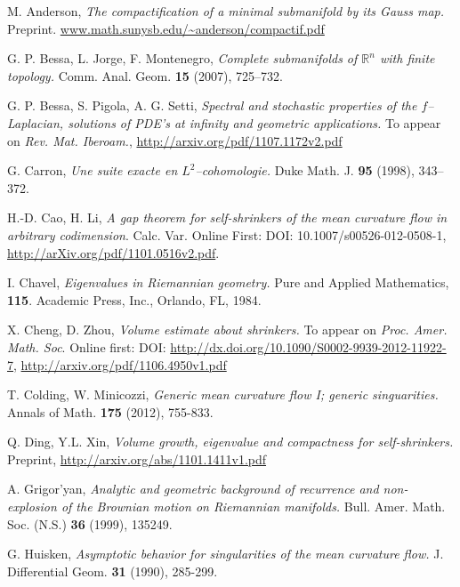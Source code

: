 \documentclass[11pt,leqno]{amsart}\usepackage{amsmath}
\numberwithin{equation}{section}
\begin{document}
\bigskip

\begin{thebibliography}{9}                                                                                                
M. Anderson, \textit{The compactification of a minimal
submanifold by its Gauss map.} Preprint. \url{www.math.sunysb.edu/~anderson/compactif.pdf}

 G. P. Bessa, L. Jorge, F. Montenegro, \textit{Complete submanifolds of $\mathbb{R}^n$ with finite topology.} Comm. Anal. Geom. \textbf{15} (2007), 725--732.

G. P. Bessa, S. Pigola, A. G. Setti, \textit{Spectral and stochastic properties of the $f$--Laplacian, solutions of PDE's at infinity and geometric applications.} To appear on \emph{Rev. Mat. Iberoam.}, \url{http://arxiv.org/pdf/1107.1172v2.pdf}

G. Carron, \textit{Une suite exacte en $L^2$--cohomologie.}
 Duke Math. J. \textbf{95} (1998), 343--372.

 H.-D. Cao, H. Li, \textit{A gap theorem for self-shrinkers of the mean curvature flow in arbitrary codimension}. Calc. Var. Online First: DOI:
10.1007/s00526-012-0508-1, \url{http://arXiv.org/pdf/1101.0516v2.pdf}.

 I. Chavel, \textit{Eigenvalues in Riemannian geometry.} Pure and Applied Mathematics, \textbf{115}. Academic Press, Inc., Orlando, FL, 1984.

 X. Cheng, D. Zhou, \textit{Volume estimate about shrinkers.} \rm{To appear on} \emph{Proc. Amer. Math. Soc}. \rm{Online first:} DOI: \url{http://dx.doi.org/10.1090/S0002-9939-2012-11922-7}, \url{http://arxiv.org/pdf/1106.4950v1.pdf}

 T. Colding, W. Minicozzi, \textit{Generic mean curvature flow I; generic singuarities.} Annals of Math. \textbf{175} (2012), 755-833.

Q. Ding, Y.L. Xin, \textit{Volume growth, eigenvalue and compactness for self-shrinkers.} Preprint, \url{http://arxiv.org/abs/1101.1411v1.pdf}

A. Grigor'yan, \textit{Analytic and geometric background of recurrence and non-explosion of the Brownian motion on Riemannian manifolds.} Bull. Amer. Math. Soc. (N.S.) \textbf{36} (1999), 135249.

 G. Huisken, \textit{Asymptotic behavior for singularities of the mean curvature flow.} J. Differential Geom. \textbf{31} (1990), 285-299.


\end{thebibliography}
\end{document}
